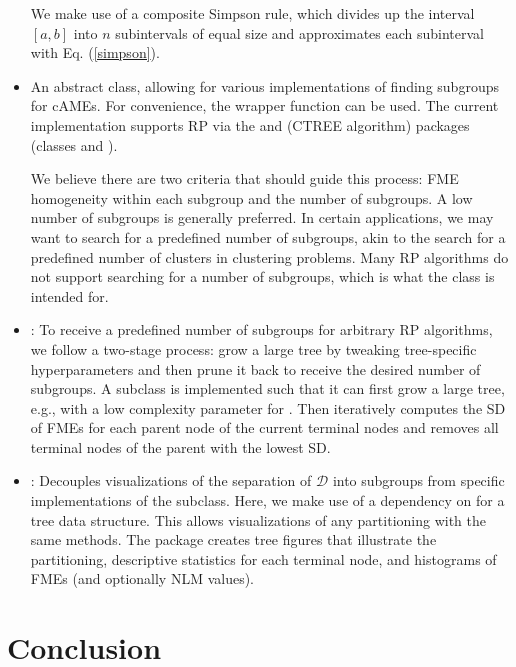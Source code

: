 \begin{itemize}
\begin{equation}
\end{equation}
We make use of a composite Simpson rule, which divides up the interval $\left[ a, b \right]$ into $n$ subintervals of equal size and approximates each subinterval with Eq. (\ref{simpson}).
\par
\item {} An abstract class, allowing for various implementations of finding subgroups for cAMEs. For convenience, the wrapper function  can be used. The current implementation supports RP via the  and  (CTREE algorithm) packages (classes  and ).
\par
We believe there are two criteria that should guide this process: FME homogeneity within each subgroup and the number of subgroups.
A low number of subgroups is generally preferred. In certain applications, we may want to search for a predefined number of subgroups, akin to the search for a predefined number of clusters in clustering problems. Many RP algorithms do not support searching for a number of subgroups, which is what the  class is intended for.
\item {}: To receive a predefined number of subgroups for arbitrary RP algorithms, we follow a two-stage process: grow a large tree by tweaking tree-specific hyperparameters and then prune it back to receive the desired number of subgroups. A  subclass is implemented such that it can first grow a large tree, e.g., with a low complexity parameter for . Then  iteratively computes the SD of FMEs for each parent node of the current terminal nodes and removes all terminal nodes of the parent with the lowest SD.
\item {}: Decouples visualizations of the separation of $\mathcal{D}$ into subgroups from specific implementations of the  subclass. Here, we make use of a dependency on  for a tree data structure. This allows visualizations of any partitioning with the same methods. The package  \citep{ggparty} creates tree figures that illustrate the partitioning, descriptive statistics for each terminal node, and histograms of FMEs (and optionally NLM values).
\end{itemize}


\section{Conclusion}


